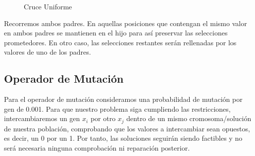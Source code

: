 \begin{figure}[H]
	\centering
	\begin{minipage}{.9\linewidth}
		
		
		
		\begin{algorithm}[H] 
			
			\caption{Cruce Uniforme}
			\SetAlgoLined
			
			
			
		\end{algorithm} 
		
	\end{minipage}
\end{figure}

Recorremos ambos padres. En aquellas posiciones que contengan el mismo valor en ambos padres se mantienen en el hijo para así preservar las selecciones prometedores.
En otro caso, las selecciones restantes serán rellenadas por los valores de uno de los padres.














\newpage 
\subsection{Operador de Mutación}
Para el operador de mutación consideramos una probabilidad de mutación por gen de 0.001. Para que nuestro problema siga cumpliendo las restricciones, intercambiaremos un gen $x_i$ por otro $x_j$ dentro de un mismo cromosoma/solución de nuestra población, comprobando que los valores a intercambiar sean opuestos, es decir, un 0 por un 1. Por tanto, las soluciones seguirán siendo factibles y no será necesaria ninguna comprobación ni reparación posterior. \\



